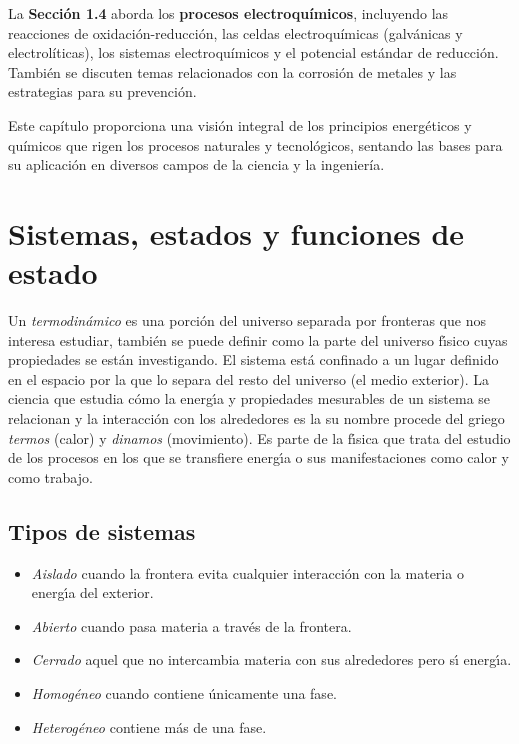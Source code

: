 La \textbf{Sección 1.4} aborda los \textbf{procesos electroquímicos}, incluyendo las reacciones de oxidación-reducción, las celdas electroquímicas (galvánicas y electrolíticas), los sistemas electroquímicos y el potencial estándar de reducción. También se discuten temas relacionados con la corrosión de metales y las estrategias para su prevención.

Este capítulo proporciona una visión integral de los principios energéticos y químicos que rigen los procesos naturales y tecnológicos, sentando las bases para su aplicación en diversos campos de la ciencia y la ingeniería.

\section{Sistemas, estados y funciones de estado}
 Un \textit{ termodin\'a\-mi\-co} es una porci\'on del universo separada por fronteras que nos interesa estudiar, tambi\'en se puede definir como la parte del universo f\'{\i}sico cuyas propiedades se est\'an investigando. El sistema est\'a confinado a un lugar definido en el espacio por la  que lo separa del resto del universo (el medio exterior). La ciencia que estudia c\'omo la energ\'{\i}a y propiedades mesurables de un sistema se relacionan y la interacci\'on con los alrededores es la \textbf{}  su nombre procede del griego \textit{termos} (calor) y \textit{dinamos} (movimiento). Es parte de la f\'{\i}sica que trata del estudio de los procesos en los que se transfiere energ\'{\i}a o sus manifestaciones como calor y como trabajo. 

\subsection{Tipos de sistemas}

\begin{itemize}
\item \textit{Aislado} cuando la frontera evita cualquier interacci\'on con la materia o  energ\'{\i}a del exterior.
\item \textit{Abierto} cuando pasa materia a trav\'es de la frontera.
\item \textit{Cerrado} aquel que no intercambia materia con sus alrededores pero s\'{\i} ener\-g\'{\i}a.
\item \textit{Homog\'eneo} cuando contiene \'unicamente una fase.
\item \textit{Heterog\'eneo} contiene m\'as de una fase.
\end{itemize}

